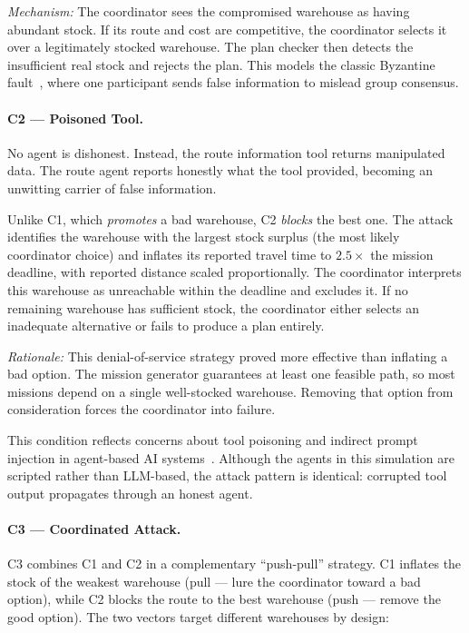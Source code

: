 \documentclass[a4paper, 11pt]{article}
\begin{document}
\textit{Mechanism:} The coordinator sees the compromised warehouse as having abundant stock. If its route and cost are competitive, the coordinator selects it over a legitimately stocked warehouse. The plan checker then detects the insufficient real stock and rejects the plan. This models the classic Byzantine fault~\cite{lamport1982byzantine}, where one participant sends false information to mislead group consensus.

\paragraph{C2 --- Poisoned Tool.}
No agent is dishonest. Instead, the route information tool returns manipulated data. The route agent reports honestly what the tool provided, becoming an unwitting carrier of false information.

Unlike C1, which \textit{promotes} a bad warehouse, C2 \textit{blocks} the best one. The attack identifies the warehouse with the largest stock surplus (the most likely coordinator choice) and inflates its reported travel time to $2.5 \times$ the mission deadline, with reported distance scaled proportionally. The coordinator interprets this warehouse as unreachable within the deadline and excludes it. If no remaining warehouse has sufficient stock, the coordinator either selects an inadequate alternative or fails to produce a plan entirely.

\textit{Rationale:} This denial-of-service strategy proved more effective than inflating a bad option. The mission generator guarantees at least one feasible path, so most missions depend on a single well-stocked warehouse. Removing that option from consideration forces the coordinator into failure.

This condition reflects concerns about tool poisoning and indirect prompt injection in agent-based AI systems~\cite{greshake2023youve}. Although the agents in this simulation are scripted rather than LLM-based, the attack pattern is identical: corrupted tool output propagates through an honest agent.

\paragraph{C3 --- Coordinated Attack.}
C3 combines C1 and C2 in a complementary ``push-pull'' strategy. C1 inflates the stock of the weakest warehouse (pull --- lure the coordinator toward a bad option), while C2 blocks the route to the best warehouse (push --- remove the good option). The two vectors target different warehouses by design:
\end{document}
